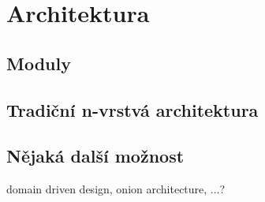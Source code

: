 \section{Architektura}

\cite{martin_2018_clean}


\subsection{Moduly}



\subsection{Tradiční n-vrstvá architektura}






\subsection{Nějaká další možnost}

domain driven design, onion architecture, ...? 




